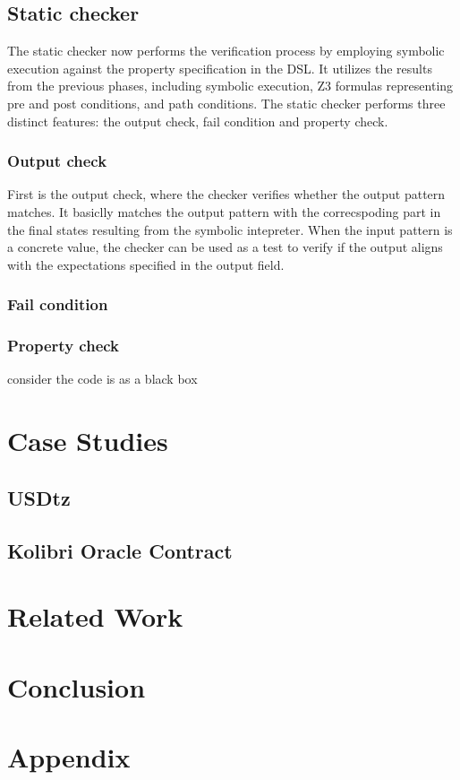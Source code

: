 \documentclass[a4paper,UKenglish,cleveref, autoref, thm-restate]{lipics-v2021}
\begin{document}
\subsection{Static checker}
The static checker now performs the verification process by employing symbolic execution against the property specification in the DSL. It utilizes the results from the previous phases, including symbolic execution, Z3 formulas representing pre and post conditions, and path conditions. The static checker performs three distinct features: the output check, fail condition and property check.

\subsubsection{Output check} First is the output check, where the checker verifies whether the output pattern matches. It basiclly matches the output pattern with the correcspoding part in the final states resulting from the symbolic intepreter.  When the input pattern is a concrete value, the checker can be used as a test to verify if the output aligns with the expectations specified in the output field. 

\subsubsection{Fail condition}

\subsubsection{Property check}

consider the code is as a black box
\section {Case Studies}
\subsection{USDtz}
\subsection{Kolibri Oracle Contract}
\section {Related Work}
\section {Conclusion}
\section {Appendix}
\end{document}
